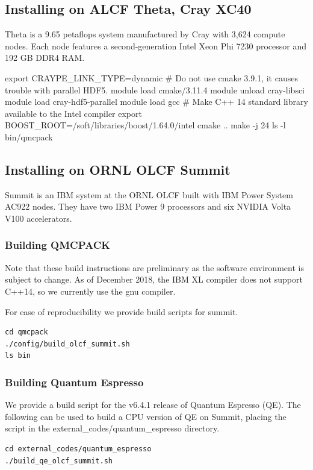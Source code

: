\subsection{Installing on ALCF Theta, Cray XC40}
Theta is a 9.65 petaflops system manufactured by Cray with 3,624 compute nodes.
Each node features a second-generation Intel Xeon Phi 7230 processor and 192 GB DDR4 RAM.

%
\begin{shade}
export CRAYPE_LINK_TYPE=dynamic
# Do not use cmake 3.9.1, it causes trouble with parallel HDF5.
module load cmake/3.11.4
module unload cray-libsci
module load cray-hdf5-parallel
module load gcc   # Make C++ 14 standard library available to the Intel compiler
export BOOST_ROOT=/soft/libraries/boost/1.64.0/intel
cmake ..
make -j 24
ls -l bin/qmcpack
\end{shade}

\subsection{Installing on ORNL OLCF Summit}
Summit is an IBM system at the ORNL OLCF built with IBM Power System AC922
nodes. They have two IBM Power 9 processors and six NVIDIA Volta V100
accelerators.

\subsubsection{Building QMCPACK}
Note that these build instructions are preliminary as the
software environment is subject to change. As of December 2018, the
IBM XL compiler does not support C++14, so we currently use the
gnu compiler. 

For ease of reproducibility we provide build scripts for summit.
\lstset{language=bash,style=SHELL}
\begin{lstlisting}
cd qmcpack
./config/build_olcf_summit.sh
ls bin
\end{lstlisting}

\subsubsection{Building Quantum Espresso}
We provide a build script for the v6.4.1 release of Quantum Espresso (QE).
The following can be used to build a CPU version of QE on Summit,
placing the script in the external\_codes/quantum\_espresso directory.

\begin{lstlisting}
cd external_codes/quantum_espresso
./build_qe_olcf_summit.sh
\end{lstlisting}

